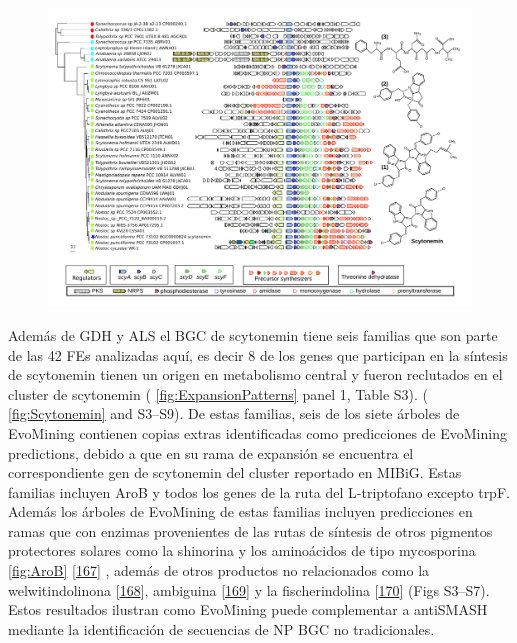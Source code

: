 \documentclass[12pt,twoside]{reedthesis}
\begin{document}
  \begin{figure}[h!tbp]
  \centering
  \includegraphics[angle = 90,scale = .8]{chapter2/FigurasPaper/Figure7.pdf}
  \caption[EvoMining Algorithm]{\footnotesize{}}
  \label{fig:CorasonScytonemina}
  \end{figure}
  
  Además de GDH y ALS el BGC de scytonemin tiene seis familias que son
  parte de las 42 FEs analizadas aquí, es decir 8 de los genes que
  participan en la síntesis de scytonemin tienen un origen en metabolismo
  central y fueron reclutados en el cluster de scytonemin (
  \autoref{fig:ExpansionPatterns} panel 1, Table S3). (
  \autoref{fig:Scytonemin} and S3--S9). De estas familias, seis de los
  siete árboles de EvoMining contienen copias extras identificadas como
  predicciones de EvoMining predictions, debido a que en su rama de
  expansión se encuentra el correspondiente gen de scytonemin del cluster
  reportado en MIBiG. Estas familias incluyen AroB y todos los genes de la
  ruta del L-triptofano excepto trpF. Además los árboles de EvoMining de
  estas familias incluyen predicciones en ramas que con enzimas
  provenientes de las rutas de síntesis de otros pigmentos protectores
  solares como la shinorina y los aminoácidos de tipo mycosporina
  \autoref{fig:AroB}
  {[}\protect\hyperlink{ref-balskus_genetic_2010}{167}{]} , además de
  otros productos no relacionados como la welwitindolinona
  {[}\protect\hyperlink{ref-hillwig_identification_2014}{168}{]},
  ambiguina
  {[}\protect\hyperlink{ref-li_hapalindole_ambiguine_2015}{169}{]} y la
  fischerindolina {[}\protect\hyperlink{ref-li_decoding_2017}{170}{]}
  (Figs S3--S7). Estos resultados ilustran como EvoMining puede
  complementar a antiSMASH mediante la identificación de secuencias de NP
  BGC no tradicionales.
  
\end{document}
